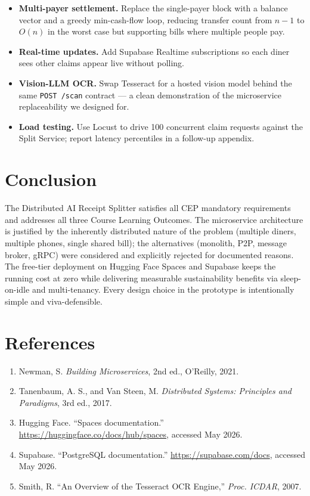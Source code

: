 \documentclass[11pt, a4paper]{article}
\begin{document}
\begin{itemize}[leftmargin=*]
\item \textbf{Multi-payer settlement.} Replace the single-payer block with a balance vector and a greedy min-cash-flow loop, reducing transfer count from $n - 1$ to $O(n)$ in the worst case but supporting bills where multiple people pay.
\item \textbf{Real-time updates.} Add Supabase Realtime subscriptions so each diner sees other claims appear live without polling.
\item \textbf{Vision-LLM OCR.} Swap Tesseract for a hosted vision model behind the same \texttt{POST /scan} contract --- a clean demonstration of the microservice replaceability we designed for.
\item \textbf{Load testing.} Use Locust to drive 100 concurrent claim requests against the Split Service; report latency percentiles in a follow-up appendix.
\end{itemize}

\section{Conclusion}

The Distributed AI Receipt Splitter satisfies all CEP mandatory requirements and addresses all three Course Learning Outcomes. The microservice architecture is justified by the inherently distributed nature of the problem (multiple diners, multiple phones, single shared bill); the alternatives (monolith, P2P, message broker, gRPC) were considered and explicitly rejected for documented reasons. The free-tier deployment on Hugging Face Spaces and Supabase keeps the running cost at zero while delivering measurable sustainability benefits via sleep-on-idle and multi-tenancy. Every design choice in the prototype is intentionally simple and viva-defensible.

\section*{References}

\begin{enumerate}[leftmargin=*]
\item Newman, S. \textit{Building Microservices}, 2nd ed., O'Reilly, 2021.
\item Tanenbaum, A. S., and Van Steen, M. \textit{Distributed Systems: Principles and Paradigms}, 3rd ed., 2017.
\item Hugging Face. ``Spaces documentation.'' \url{https://huggingface.co/docs/hub/spaces}, accessed May 2026.
\item Supabase. ``PostgreSQL documentation.'' \url{https://supabase.com/docs}, accessed May 2026.
\item Smith, R. ``An Overview of the Tesseract OCR Engine,'' \textit{Proc. ICDAR}, 2007.
\end{enumerate}
\end{document}
